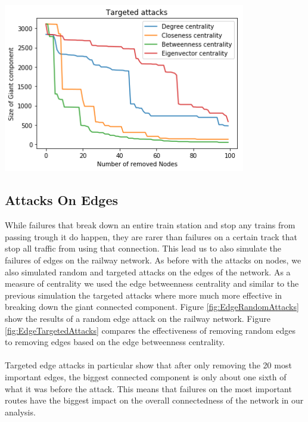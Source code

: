 \documentclass{Resources/netsci-project}
\begin{document}
\begin{center}
    \centering
    \includegraphics[width=300pt]{Resources/node_targeted_attacks}
    \label{fig:NodeTargetedAttacks}
\end{center}

\subsection{Attacks On Edges}
While failures that break down an entire train station and stop any trains from passing trough it do happen, they are rarer than failures on a certain track that stop all traffic from using that connection. This lead us to also simulate the failures of edges on the railway network. As before with the attacks on nodes, we also simulated random and targeted attacks on the edges of the network. As a measure of centrality we used the edge betweenness centrality and similar to the previous simulation the targeted attacks where more much more effective in breaking down the giant connected component. Figure \ref{fig:EdgeRandomAttacks} show the results of a random edge attack on the railway network. Figure \ref{fig:EdgeTargetedAttacks} compares the effectiveness of removing random edges to removing edges based on the edge betweenness centrality.
\\~\\
Targeted edge attacks in particular show that after only removing the 20 most important edges, the biggest connected component is only about one sixth of what it was before the attack. This means that failures on the most important routes have the biggest impact on the overall connectedness of the network in our analysis.
\end{document}

